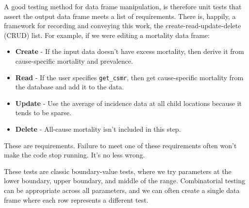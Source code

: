 \documentclass[fleqn,10pt]{olplainarticle}
\begin{document}
A good testing method for data frame manipulation, is therefore
unit tests that assert the output data frame meets a list of requirements.
There is, happily, a framework
for recording and conveying this work, the create-read-update-delete
(CRUD) list. For example, if we were editing a mortality data frame:
\begin{itemize}
\item \textbf{Create} - If the input data doesn't have excess mortality,
  then derive it from cause-specific mortality and prevalence.
\item \textbf{Read} - If the user specifies \lstinline!get_csmr!, then get cause-specific
  mortality from the database and add it to the data.
\item \textbf{Update} - Use the average of incidence data at all child
  locations because it tends to be sparse.
\item \textbf{Delete} - All-cause mortality isn't included in this step.
\end{itemize}
These are requirements. Failure to meet one of these requirements
often won't make the code stop running. It's no less wrong.

These tests are classic boundary-value tests, where
we try parameters at the lower boundary, upper boundary,
and middle of the range. Combinatorial testing can be appropriate
across all parameters, and we can often create a single data frame
where each row represents a different test.
\end{document}

